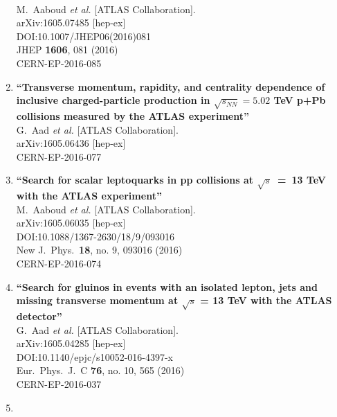 \documentclass{article}
\begin{document}
\begin{enumerate}
  \\{}M.~Aaboud {\it et al.} [ATLAS Collaboration].
  \\{}arXiv:1605.07485 [hep-ex]
  \\{}DOI:10.1007/JHEP06(2016)081
  \\{}JHEP {\bf 1606}, 081 (2016)
  \\{}CERN-EP-2016-085
\item%
{\bf ``Transverse momentum, rapidity, and centrality dependence of inclusive charged-particle production in $\sqrt{s_{NN}}=5.02$ TeV p+Pb collisions measured by the ATLAS experiment''}
  \\{}G.~Aad {\it et al.} [ATLAS Collaboration].
  \\{}arXiv:1605.06436 [hep-ex]
  \\{}CERN-EP-2016-077
\item%
{\bf ``Search for scalar leptoquarks in pp collisions at $\sqrt{s}$ = 13 TeV with the ATLAS experiment''}
  \\{}M.~Aaboud {\it et al.} [ATLAS Collaboration].
  \\{}arXiv:1605.06035 [hep-ex]
  \\{}DOI:10.1088/1367-2630/18/9/093016
  \\{}New J.\ Phys.\  {\bf 18}, no. 9, 093016 (2016)
  \\{}CERN-EP-2016-074
\item%
{\bf ``Search for gluinos in events with an isolated lepton, jets and missing transverse momentum at $\sqrt{s}$ = 13 TeV with the ATLAS detector''}
  \\{}G.~Aad {\it et al.} [ATLAS Collaboration].
  \\{}arXiv:1605.04285 [hep-ex]
  \\{}DOI:10.1140/epjc/s10052-016-4397-x
  \\{}Eur.\ Phys.\ J.\ C {\bf 76}, no. 10, 565 (2016)
  \\{}CERN-EP-2016-037
\item%

\end{enumerate}
\end{document}

